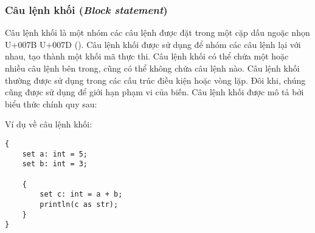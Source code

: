 \subsubsection{Câu lệnh khối (\textit{Block statement})}

Câu lệnh khối là một nhóm các câu lệnh được đặt trong một cặp dấu ngoặc nhọn U+007B U+007D (\kw{\{ \}}). Câu lệnh khối được sử dụng để nhóm các câu lệnh lại với nhau, tạo thành một khối mã thực thi. Câu lệnh khối có thể chứa một hoặc nhiều câu lệnh bên trong, cũng có thể không chứa câu lệnh nào. Câu lệnh khối thường được sử dụng trong các cấu trúc điều kiện hoặc vòng lặp. Đôi khi, chúng cũng được sử dụng để giới hạn phạm vi của biến. Câu lệnh khối được mô tả bởi biểu thức chính quy sau:

\label{ch2:block_stmt}
\regexblockstmt

\noindent Ví dụ về câu lệnh khối:
\begin{lstlisting}[]
{
    set a: int = 5;
    set b: int = 3;

    {
        set c: int = a + b;
        println(c as str);
    }
}
\end{lstlisting}

